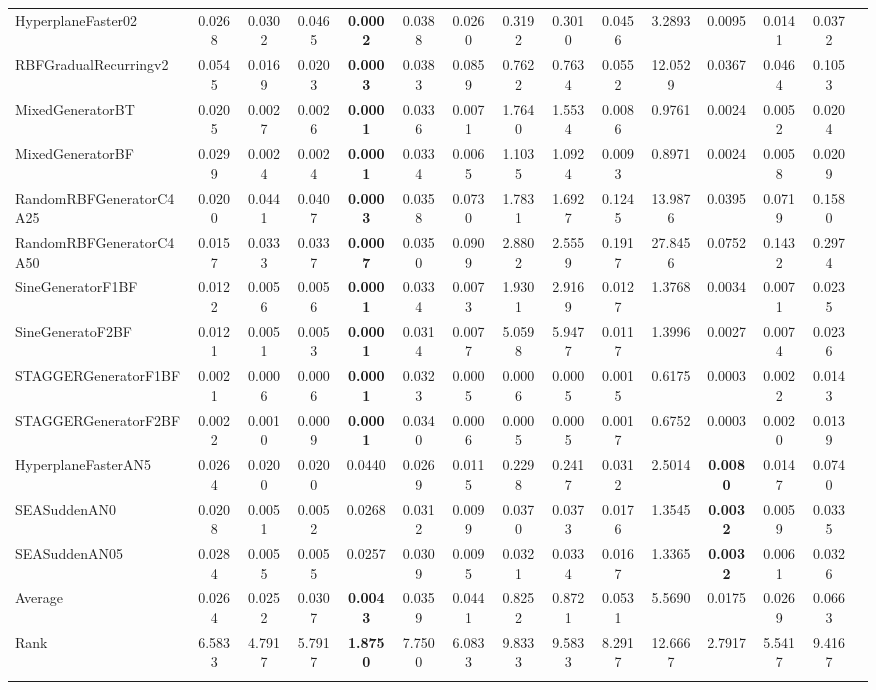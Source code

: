 \documentclass[reqno]{vcuthesis}
\numberwithin{equation}{chapter}
\begin{document}
\begin{table}[t!]
{\begin{tabularx}{1.45\textwidth}{l@{\extracolsep{\fill}}cccccccccccccc}
HyperplaneFaster02 &0.0268 &0.0302 &0.0465 &\textbf{0.0002} &0.0388 &0.0260 &0.3192 &0.3010 &0.0456 &3.2893 &0.0095 &0.0141 &0.0372  \\
RBFGradualRecurringv2 &0.0545 &0.0169 &0.0203 &\textbf{0.0003} &0.0383 &0.0859 &0.7622 &0.7634 &0.0552 &12.0529 &0.0367 &0.0464 &0.1053  \\
MixedGeneratorBT &0.0205 &0.0027 &0.0026 &\textbf{0.0001} &0.0336 &0.0071 &1.7640 &1.5534 &0.0086 &0.9761 &0.0024 &0.0052 &0.0204   \\
MixedGeneratorBF &0.0299 &0.0024 &0.0024 &\textbf{0.0001} &0.0334 &0.0065 &1.1035 &1.0924 &0.0093 &0.8971 &0.0024 &0.0058 &0.0209   \\
RandomRBFGeneratorC4A25 &0.0200 &0.0441 &0.0407 &\textbf{0.0003} &0.0358 &0.0730 &1.7831 &1.6927 &0.1245 &13.9876 &0.0395 &0.0719 &0.1580   \\
RandomRBFGeneratorC4A50 &0.0157 &0.0333 &0.0337 &\textbf{0.0007} &0.0350 &0.0909 &2.8802 &2.5559 &0.1917 &27.8456 &0.0752 &0.1432 &0.2974   \\
SineGeneratorF1BF &0.0122 &0.0056 &0.0056 &\textbf{0.0001} &0.0334 &0.0073 &1.9301 &2.9169 &0.0127 &1.3768 &0.0034 &0.0071 &0.0235   \\
SineGeneratoF2BF &0.0121 &0.0051 &0.0053 &\textbf{0.0001} &0.0314 &0.0077 &5.0598 &5.9477 &0.0117 &1.3996 &0.0027 &0.0074 &0.0236   \\
STAGGERGeneratorF1BF &0.0021 &0.0006 &0.0006 &\textbf{0.0001} &0.0323 &0.0005 &0.0006 &0.0005 &0.0015 &0.6175 &0.0003 &0.0022 &0.0143   \\
STAGGERGeneratorF2BF &0.0022 &0.0010 &0.0009 &\textbf{0.0001} &0.0340 &0.0006 &0.0005 &0.0005 &0.0017 &0.6752 &0.0003 &0.0020 &0.0139   \\
HyperplaneFasterAN5 &0.0264 &0.0200 &0.0200 &0.0440 &0.0269 &0.0115 &0.2298 &0.2417 &0.0312 &2.5014 &\textbf{0.0080} &0.0147 &0.0740   \\
SEASuddenAN0 &0.0208 &0.0051 &0.0052 &0.0268 &0.0312 &0.0099 &0.0370 &0.0373 &0.0176 &1.3545 &\textbf{0.0032} &0.0059 &0.0335   \\
SEASuddenAN05 &0.0284 &0.0055 &0.0055 &0.0257 &0.0309 &0.0095 &0.0321 &0.0334 &0.0167 &1.3365 &\textbf{0.0032} &0.0061 &0.0326   \\
\noalign{\smallskip}\hline\noalign{\smallskip}
Average &0.0264 &0.0252 &0.0307 &\textbf{0.0043} &0.0359 &0.0441 &0.8252 &0.8721 &0.0531 &5.5690 &0.0175 &0.0269 &0.0663   \\
Rank &6.5833 &4.7917 &5.7917 &\textbf{1.8750} &7.7500 &6.0833 &9.8333 &9.5833 &8.2917 &12.6667 &2.7917 &5.5417 &9.4167   \\
\noalign{\smallskip}\hline\noalign{\smallskip}
\end{tabularx}}
\begin{minipage}{0.9\textwidth}
\centering
{}
\end{minipage}
\end{table}
\end{document}

